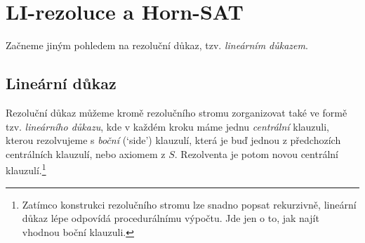 \section{LI-rezoluce a Horn-SAT}

Začneme jiným pohledem na rezoluční důkaz, tzv. \emph{lineárním důkazem}.

\subsection{Lineární důkaz}

Rezoluční důkaz můžeme kromě rezolučního stromu zorganizovat také ve formě tzv. \emph{lineárního důkazu}, kde v každém kroku máme jednu \emph{centrální} klauzuli, kterou rezolvujeme s \emph{boční} (`side') klauzulí, která je buď jednou z předchozích centrálních klauzulí, nebo axiomem z $S$. Rezolventa je potom novou centrální klauzulí.\footnote{Zatímco konstrukci rezolučního stromu lze snadno popsat rekurzivně, lineární důkaz lépe odpovídá procedurálnímu výpočtu. Jde jen o to, jak najít vhodnou boční klauzuli.}

